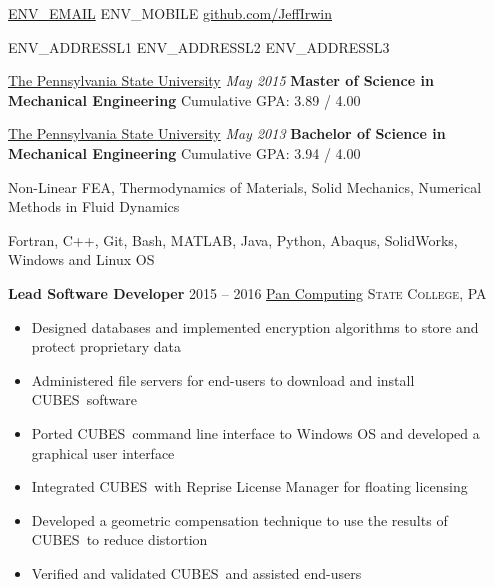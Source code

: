 \documentclass[10pt,letterpaper]{article}
\begin{document}
\sloppy  %


\nobreakvspace{0.3em}  %


\noindent
\href{mailto:ENV\_EMAIL}{ENV\_EMAIL}\sbull
ENV\_MOBILE\sbull
\href{https://github.com/JeffIrwin}{github.com/JeffIrwin}

\noindent
ENV\_ADDRESSL1\sbull
ENV\_ADDRESSL2\sbull
ENV\_ADDRESSL3

\spacedhrule{0.9em}{-0.4em}  %

\noindent \href{https://www.psu.edu/}{The Pennsylvania State University} \hfill \emph{May 2015} \break
\textbf{Master of Science in Mechanical Engineering} \hfill Cumulative GPA:  3.89 / 4.00

\vspace{1em}
\noindent \href{https://www.psu.edu/}{The Pennsylvania State University} \hfill \emph{May 2013} \break
\textbf{Bachelor of Science in Mechanical Engineering} \hfill Cumulative GPA:  3.94 / 4.00

Non-Linear FEA, Thermodynamics of Materials, Solid Mechanics, Numerical Methods in Fluid Dynamics

Fortran, C++, Git, Bash, MATLAB, Java, Python, Abaqus, SolidWorks, Windows and Linux OS

\spacedhrule{0.5em}{-0.4em}

\noindent \textbf{Lead Software Developer} \hfill 2015 -- 2016 \break
\href{http://www.pancomputing.com}{Pan Computing} \hfill \textsc{State College, PA}
\begin{itemize}
	\item Designed databases and implemented encryption algorithms to store and protect proprietary data
	\item Administered file servers for end-users to download and install CUBES\textsuperscript\textregistered\ software
	\item Ported CUBES\textsuperscript\textregistered\ command line interface to Windows OS and developed a graphical user interface
	\item Integrated CUBES\textsuperscript\textregistered\ with Reprise License Manager for floating licensing
	\item Developed a geometric compensation technique to use the results of CUBES\textsuperscript\textregistered\ to reduce distortion
	\item Verified and validated CUBES\textsuperscript\textregistered\ and assisted end-users
\end{itemize}
\end{document}
